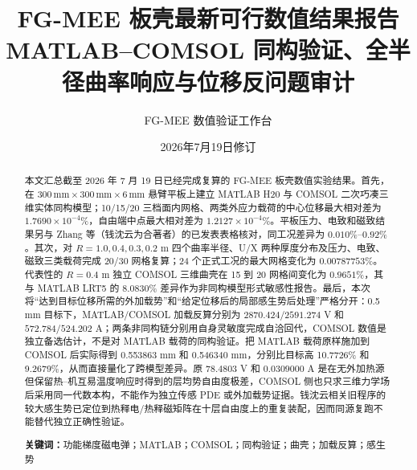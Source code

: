 \documentclass[UTF8,fontset=windows,11pt,a4paper]{ctexart}
\title{\textbf{FG-MEE 板壳最新可行数值结果报告}\\[0.35em]
\large MATLAB--COMSOL 同构验证、全半径曲率响应与位移反问题审计}
\author{FG-MEE 数值验证工作台}
\date{2026年7月19日修订}
\begin{document}
\maketitle

\begin{abstract}
本文汇总截至 2026 年 7 月 19 日已经完成复算的 FG-MEE 板壳数值实验结果。首先，在 $300\,\mathrm{mm}\times300\,\mathrm{mm}\times6\,\mathrm{mm}$ 悬臂平板上建立 MATLAB H20 与 COMSOL 二次巧凑三维实体同构模型；10/15/20 三档面内网格、两类外应力载荷的中心位移最大相对差为 $1.7690\times10^{-4}\%$，自由端中点最大相对差为 $1.2127\times10^{-4}\%$。平板压力、电致和磁致结果另与 Zhang 等（钱沈云为合著者）的已发表表格核对，同工况差异为 $0.010\%$--$0.92\%$。其次，对 $R=1.0,0.4,0.3,0.2$ m 四个曲率半径、U/X 两种厚度分布及压力、电致、磁致三类载荷完成 20/30 网格复算；24 个正式工况的最大网格变化为 $0.00787753\%$。代表性的 $R=0.4$ m 独立 COMSOL 三维曲壳在 15 到 20 网格间变化为 $0.9651\%$，其与 MATLAB LRT5 的 $8.0830\%$ 差异作为非同构模型形式敏感性报告。最后，本次将“达到目标位移所需的外加载势”和“给定位移后的局部感生势后处理”严格分开：0.5 mm 目标下，MATLAB/COMSOL 加载反算分别为 $2870.424/2591.274$ V 和 $572.784/524.202$ A；两条非同构链分别用自身灵敏度完成自洽回代，COMSOL 数值是独立备选估计，不是对 MATLAB 载荷的同构验证。把 MATLAB 载荷原样施加到 COMSOL 后实际得到 0.553863 mm 和 0.546340 mm，分别比目标高 10.7726\% 和 9.2679\%，从而直接量化了跨模型差异。原 $78.4803$ V 和 $0.0309000$ A 是在无外加热源但保留热--机互易温度响应时得到的层均势自由度极差，COMSOL 侧也只求三维力学场后采用同一代数本构，不能作为独立传感 PDE 或外加载势证据。钱沈云相关旧程序的较大感生势已定位到热释电/热释磁矩阵在十层自由度上的重复装配，因而同源复跑不能替代独立正确性验证。

\noindent\textbf{关键词：}功能梯度磁电弹；MATLAB；COMSOL；同构验证；曲壳；加载反算；感生势
\end{abstract}

\begin{center}
\end{center}
\end{document}

